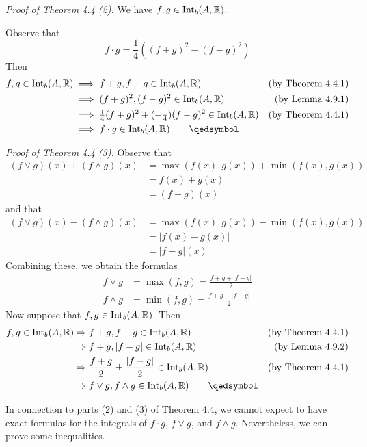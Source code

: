 \documentclass[11pt]{article}
\theoremstyle{definition}
\newcommand{\R}{\ensuremath{\mathbb{R}}}
\newcommand{\QED}{\tag*{$\qedsymbol$}}
\begin{document}
{\it Proof of Theorem 4.4 (2).} We have $f, g \in {\rm Int}_b (A, \R)$. 

Observe that 
$$f \cdot g = \frac14 \left( (f+g)^2 - (f-g)^2 \right)$$
Then
\begin{align*}
    f, g \in {\rm Int}_b (A, \R) 
    &\implies f + g, f - g \in {\rm Int}_b (A, \R) & \text{(by Theorem 4.4.1)} \\
    &\implies (f + g)^2, (f - g)^2 \in {\rm Int}_b (A, \R) & \text{(by Lemma 4.9.1)} \\
    &\implies \tfrac14(f+g)^2 + (-\tfrac14)(f-g)^2 \in {\rm Int}_b (A, \R) & \text{(by Theorem 4.4.1)} \\
    &\implies f \cdot g \in {\rm Int}_b (A, \R) 
    \QED
\end{align*}

{\it Proof of Theorem 4.4 (3).} 
Observe that
\begin{align*}
    (f \vee g)(x) + (f \wedge g)(x) 
    &= \max(f(x), g(x)) + \min(f(x), g(x)) \\
    &= f(x) + g(x) \\
    &= (f + g)(x)
\end{align*}
and that
\begin{align*}
    (f \vee g)(x) - (f \wedge g)(x) 
    &= \max(f(x), g(x)) - \min(f(x), g(x)) \\
    &= |f(x) - g(x)| \\
    &= |f - g|(x)
\end{align*}
Combining these, we obtain the formulas
\begin{align*}
    f \vee g &= \max(f, g) = \frac{f+g + |f-g|}2 \\
    f \wedge g &= \min(f, g) = \frac{f+g - |f-g|}2
\end{align*}
Now suppose that $f, g \in {\rm Int}_b (A, \R)$. Then
\begin{align*}
    f, g \in {\rm Int}_b (A, \R) 
    &\Rightarrow f+g, f-g \in {\rm Int}_b (A, \R) & \text{(by Theorem 4.4.1)} \\
    &\Rightarrow f+g, |f-g| \in {\rm Int}_b (A, \R) & \text{(by Lemma 4.9.2)} \\
    &\Rightarrow \frac{f+g}2 \pm \frac{|f-g|}2 \in {\rm Int}_b (A, \R)  & \text{(by Theorem 4.4.1)} \\
    &\Rightarrow f \vee g, f \wedge g \in {\rm Int}_b (A, \R) \QED
\end{align*}

In connection to parts (2) and (3) of Theorem 4.4, we cannot expect to have exact formulas for the integrals of $f \cdot g$, $f \vee g$, and $f \wedge g$. Nevertheless, we can prove some inequalities.
\end{document}
